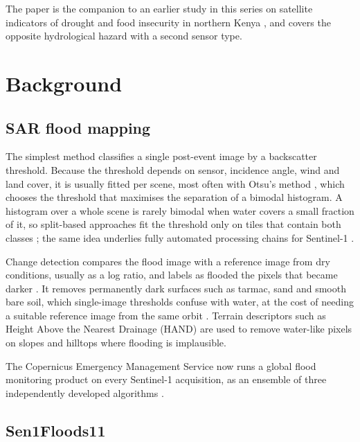 \documentclass[11pt]{article}
\begin{document}
The paper is the companion to an earlier study in this series on satellite
indicators of drought and food insecurity in northern Kenya \cite{ouma2026drought},
and covers the opposite hydrological hazard with a second sensor type.

\section{Background}
\label{sec:background}

\subsection{SAR flood mapping}

The simplest method classifies a single post-event image by a backscatter
threshold. Because the threshold depends on sensor, incidence angle, wind and
land cover, it is usually fitted per scene, most often with Otsu's method
\cite{otsu1979}, which chooses the threshold that maximises the separation of
a bimodal histogram. A histogram over a whole scene is rarely bimodal when
water covers a small fraction of it, so split-based approaches fit the
threshold only on tiles that contain both classes
\cite{martinis2009,chini2017}; the same idea underlies fully automated
processing chains for Sentinel-1 \cite{twele2016,martinis2015}.

Change detection compares the flood image with a reference image from dry
conditions, usually as a log ratio, and labels as flooded the pixels that
became darker \cite{bazi2005,hostache2012}. It removes permanently dark
surfaces such as tarmac, sand and smooth bare soil, which single-image
thresholds confuse with water, at the cost of needing a suitable reference
image from the same orbit \cite{hostache2012}. Terrain descriptors such as
Height Above the Nearest Drainage (HAND) \cite{renno2008,nobre2011} are used
to remove water-like pixels on slopes and hilltops where flooding is
implausible.

The Copernicus Emergency Management Service now runs a global flood
monitoring product on every Sentinel-1 acquisition, as an ensemble of three
independently developed algorithms \cite{salamon2021,krullikowski2023}.

\subsection{Sen1Floods11}
\end{document}
